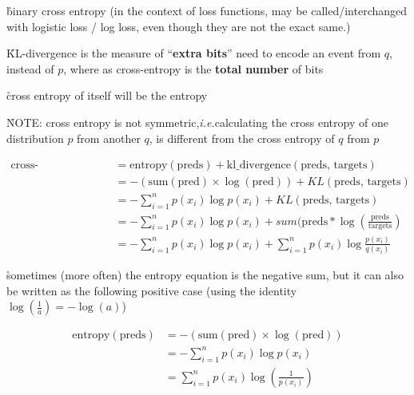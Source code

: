 \r{binary cross entropy (in the context of loss functions, may be called/interchanged with logistic loss / log loss, even though they are not the exact same.)}

\r{KL-divergence is the measure of ``\textbf{extra bits}'' need to encode an event from $q$, instead of $p$, where as cross-entropy is the \textbf{total number} of bits}

\r{cross entropy of itself will be the entropy}

\r{NOTE: cross entropy is not symmetric,\textit{i.e.}calculating the cross entropy of one distribution $p$ from another $q$, is different from the cross entropy of $q$ from $p$}





\begin{equation}
	\begin{split}
		\textrm{cross-entropy(preds, targets) } & =  \textrm{entropy} (\textrm{preds}) + \textrm{kl\_divergence}(\textrm{preds, targets})\\
		& = -(\textrm{sum}(\textrm{pred}) \times \log (\textrm{pred}) )+ KL(\textrm{preds, targets})\\
		& =  -\sum_{i=1}^{n}p(x_i)\log p(x_i)+ KL(\textrm{preds, targets}) \\
		& =  -\sum_{i=1}^{n}p(x_i)\log p(x_i)+ sum(\textrm{preds} * \log ( \frac{\textrm{preds}}{\textrm{targets}} ) \\
		& =  -\sum_{i=1}^{n}p(x_i)\log p(x_i)+ \sum_{i=1}^{n}p(x_i)\log \frac{p(x_i)}{q(x_i)} 
	\end{split}
\end{equation}

\r{sometimes (more often) the entropy equation is the negative sum, but it can also be written as the following positive case (using the identity $ \log ( \frac{1}{a} )  = - \log (a) $)}

\begin{equation}
	\begin{split}
		\textrm{entropy} (\textrm{preds})  & =  -(\textrm{sum}(\textrm{pred}) \times \log (\textrm{pred}) )\\
		& = - \sum_{i=1}^{n}p(x_i)\log p(x_i) \\
		& =   \sum_{i=1}^{n}p(x_i)\log ( \frac{1}{p(x_i) } )
	\end{split}
\end{equation}


